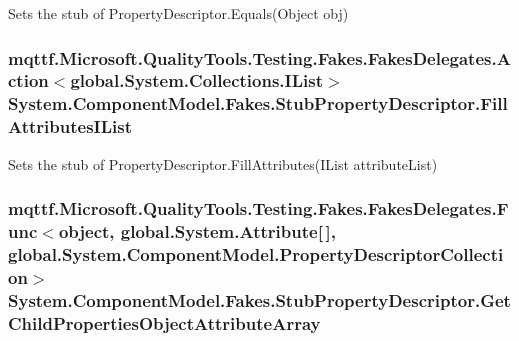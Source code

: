Sets the stub of Property\-Descriptor.\-Equals(\-Object obj)

\hypertarget{class_system_1_1_component_model_1_1_fakes_1_1_stub_property_descriptor_a66cfa436a03d8f4762ecef9d96bd259c}{
\subsubsection[{Fill\-Attributes\-I\-List}]{\setlength{\rightskip}{0pt plus 5cm}mqttf.\-Microsoft.\-Quality\-Tools.\-Testing.\-Fakes.\-Fakes\-Delegates.\-Action$<$global.\-System.\-Collections.\-I\-List$>$ System.\-Component\-Model.\-Fakes.\-Stub\-Property\-Descriptor.\-Fill\-Attributes\-I\-List}}\label{class_system_1_1_component_model_1_1_fakes_1_1_stub_property_descriptor_a66cfa436a03d8f4762ecef9d96bd259c}


Sets the stub of Property\-Descriptor.\-Fill\-Attributes(\-I\-List attribute\-List)

\hypertarget{class_system_1_1_component_model_1_1_fakes_1_1_stub_property_descriptor_aaffcf6f83e8e96ee77e105b9b721bf0a}{
\subsubsection[{Get\-Child\-Properties\-Object\-Attribute\-Array}]{\setlength{\rightskip}{0pt plus 5cm}mqttf.\-Microsoft.\-Quality\-Tools.\-Testing.\-Fakes.\-Fakes\-Delegates.\-Func$<$object, global.\-System.\-Attribute\mbox{[}$\,$\mbox{]}, global.\-System.\-Component\-Model.\-Property\-Descriptor\-Collection$>$ System.\-Component\-Model.\-Fakes.\-Stub\-Property\-Descriptor.\-Get\-Child\-Properties\-Object\-Attribute\-Array}}\label{class_system_1_1_component_model_1_1_fakes_1_1_stub_property_descriptor_aaffcf6f83e8e96ee77e105b9b721bf0a}


